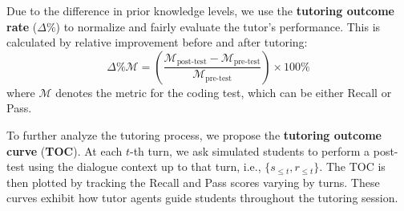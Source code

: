 Due to the difference in prior knowledge levels, we use the \textbf{tutoring outcome rate} (\textbf{$\Delta\%$}) to normalize and fairly evaluate the tutor's performance. This is calculated by relative improvement before and after tutoring:
\begin{equation}
    \Delta\%\mathcal{M}= \left(\frac{\mathcal{M}_{\text{post-test}}-\mathcal{M}_{\text{pre-test}}}{\mathcal{M}_{\text{pre-test}}}\right) \times 100\%
\end{equation}
where $\mathcal{M}$ denotes the metric for the coding test, which can be either Recall or Pass.

To further analyze the tutoring process, we propose the \textbf{tutoring outcome curve} (\textbf{TOC}). At each $t$-th turn, we ask simulated students to perform a post-test using the dialogue context up to that turn, i.e., $\{s_{\leq t},r_{\leq t}\}$. The TOC is then plotted by tracking the Recall and Pass scores varying by turns. These curves exhibit how tutor agents guide students throughout the tutoring session.
